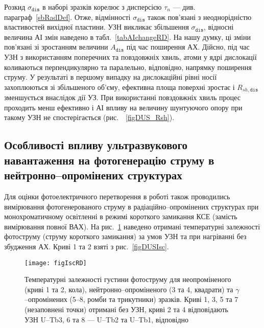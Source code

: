 Розкид $\sigma_{\mathtt{dis}}$ в наборі зразків корелює з дисперсією $\tau_n$ --- див. параграф~\ref{sbRadDef}.
Отже, відмінності $\sigma_{\mathtt{dis}}$ також пов'язані з неоднорідністю
властивостей вихідної пластини.
УЗН викликає збільшення $\sigma_{\mathtt{dis}}$, відносні величина АІ змін
наведено в табл.~\ref{tabAIchangeRD}.
На нашу думку, ці зміни пов'язані зі зростанням величини $A_\mathtt{dis}$ під час поширення АХ.
Дійсно, під час УЗН з використанням поперечних та повздовжніх хвиль,
атоми у ядрі дислокації коливаються перпендикулярно та паралельно, відповідно, напрямку поширення струму.
У результаті в першому випадку на дислокаційні рівні носії захоплюються зі збільшеного об'єму,
ефективна площа поверхні зростає і $R_{sh,\mathtt{dis}}$ зменшується внаслідок дії УЗ.
При використанні повздовжніх хвиль процес проходить менш ефективно і АІ впливу на величину
шунтуючого опору при такому УЗН не спостерігається (рис.~~\ref{figDUS_Rsh}).

\subsection{Особливості впливу ультразвукового навантаження на фотогенерацію струму в нейтронно--опромінених структурах\label{sbNIsc}}

Для оцінки фотоелектричного перетворення в роботі також проводились вимірювання фотогенерованого струму
в радіаційно--опромінених структурах
при монохроматичному освітленні в режимі короткого замикання КСЕ (замість вимірювання повної ВАХ).
На рис.~\ref{figIscRD} наведено отримані температурні залежності фотоструму (струму короткого замикання)
за умов УЗН та при нагріванні без збудження АХ.
Криві 1 та 2 взяті з рис.~\ref{figDUSIsc}.




\begin{figure}[b]
\center
\texttt{[image: figIscRD]}
\caption{\label{figIscRD}
Температурні залежності густини фотоструму
для неопроміненого (криві 1 та 2, кола),
нейтронно--опроміненого (3 та 4, квадрати) та
$\gamma$--опромінених (5--8, ромби та трикутники)
зразків.
Криві 1, 3, 5 та 7 (незаповнені точки) отримані без УЗН,
криві 2 та 4 відповідають УЗН U--Tb3,
6 та 8 ---
U--Tb2 та U--Tb1, відповідно
}%
\end{figure}

